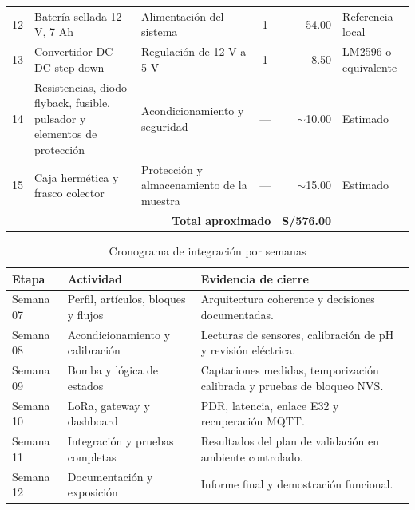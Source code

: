 \documentclass[11pt,a4paper]{article}
\begin{document}
{\begin{longtable}{r p{4.2cm}p{4.1cm}c r p{3.2cm}}
12 &
Batería sellada 12 V, 7 Ah &
Alimentación del sistema &
1 &
54.00 &
Referencia local \\

13 &
Convertidor DC-DC step-down &
Regulación de 12 V a 5 V &
1 &
8.50 &
LM2596 o equivalente \\

14 &
Resistencias, diodo flyback, fusible, pulsador y elementos de protección &
Acondicionamiento y seguridad &
--- &
$\sim$10.00 &
Estimado \\

15 &
Caja hermética y frasco colector &
Protección y almacenamiento de la muestra &
--- &
$\sim$15.00 &
Estimado \\

\midrule

\multicolumn{4}{r}{\textbf{Total aproximado}} &
\textbf{S/576.00} &
\\

\bottomrule
\end{longtable}
}

\begin{table}[htbp]

\centering

\caption{Cronograma de integración por semanas}
\label{tab:cronograma}

\begin{tabularx}{\textwidth}{p{2cm}YY}

\toprule
Etapa &
Actividad &
Evidencia de cierre \\
\midrule

Semana 07 &
Perfil, artículos, bloques y flujos &
Arquitectura coherente y decisiones documentadas. \\

Semana 08 &
Acondicionamiento y calibración &
Lecturas de sensores, calibración de pH y revisión eléctrica. \\

Semana 09 &
Bomba y lógica de estados &
Captaciones medidas, temporización calibrada y pruebas de bloqueo NVS. \\

Semana 10 &
LoRa, gateway y dashboard &
PDR, latencia, enlace E32 y recuperación MQTT. \\

Semana 11 &
Integración y pruebas completas &
Resultados del plan de validación en ambiente controlado. \\

Semana 12 &
Documentación y exposición &
Informe final y demostración funcional. \\

\bottomrule

\end{tabularx}
\end{table}
\end{document}

